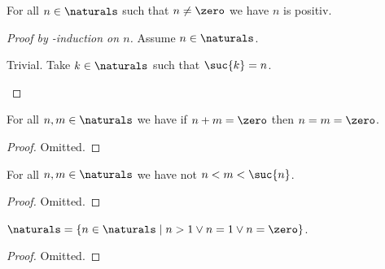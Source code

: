 \begin{proposition}\label{naturals_are_positiv_besides_zero}
    For all $n \in \naturals$ such that $n \neq \zero$ we have $n$ is positiv.
\end{proposition}
\begin{proof}[Proof by \in-induction on $n$]
    Assume $n \in \naturals$.
    \begin{byCase}
         Trivial.
            Take $k \in \naturals$ such that $\suc{k} = n$.
    \end{byCase}
\end{proof}



\begin{proposition}\label{naturals_sum_eq_zero}
    For all $n,m \in \naturals$ we have if $n+m = \zero$ then $n = m = \zero$.
\end{proposition}
\begin{proof}
    Omitted.
\end{proof}

\begin{proposition}\label{no_natural_between_n_and_suc_n}
    For all $n,m \in \naturals$ we have not $n < m < \suc{n}$.
\end{proposition}
\begin{proof}
    Omitted.
\end{proof}

\begin{proposition}\label{naturals_is_zero_one_or_greater}
    $\naturals = \{n \in \naturals \mid n > 1 \lor n = 1 \lor n = \zero\}$.
\end{proposition}
\begin{proof}
    Omitted.
\end{proof}

